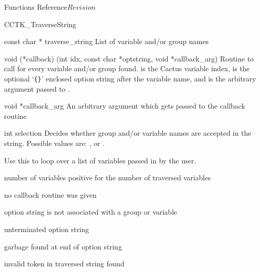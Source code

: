 \begin{cactuspart}{ Functions Reference}{}{$Revision$}
\begin{FunctionDescription}{CCTK\_TraverseString}
\begin{ParameterSection}
   \begin{Parameter} {const char * traverse\_string}
   List of variable and/or group names
   \end{Parameter}
   \begin{Parameter} {void (*callback) (int idx, const char *optstring, void *callback\_arg)}
   Routine to call for every variable and/or group found.  is the
   Cactus variable index,  is the optional `\verb|{}|'
   enclosed option string after the variable name, and  is
   the arbitrary argument passed to .
   \end{Parameter}
   \begin{Parameter} {void *callback\_arg}
   An arbitrary argument which gets passed to the callback routine
   \end{Parameter}
   \begin{Parameter} {int selection}
   Decides whether group and/or variable names are accepted in the string.
   Possible values are: ,  or
   .
   \end{Parameter}
\end{ParameterSection}

\begin{Discussion}
Use this to loop over a list of variables passed in by the user.
\end{Discussion}

\begin{ResultSection}
\begin{Result}{number of variables}
positive for the number of traversed variables
\end{Result}
\end{ResultSection}

\begin{ErrorSection}
\begin{Error}{-1}
no callback routine was given
\end{Error}
\begin{Error}{-2}
option string is not associated with a group or variable
\end{Error}
\begin{Error}{-3}
unterminated option string
\end{Error}
\begin{Error}{-4}
garbage found at end of option string
\end{Error}
\begin{Error}{-5}
invalid token in traversed string found
\end{Error}
\end{ErrorSection}
\end{FunctionDescription}



\end{cactuspart}
